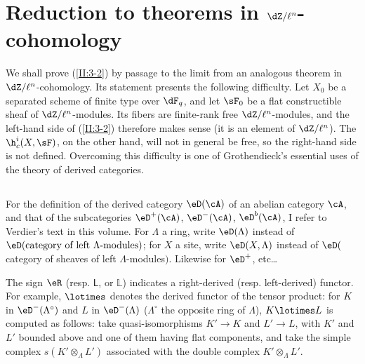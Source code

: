 \section{Reduction to theorems in \texorpdfstring{$\dZ/\ell^n$}{Z/l n}-cohomology}\label{II:4}

We shall prove (\ref{II:3-2}) by passage to the limit from an analogous
theorem in $\dZ/\ell^n$-cohomology. Its statement presents the following
difficulty. Let $X_0$ be a separated scheme of finite type over $\dF_q$, and
let $\sF_0$ be a flat constructible sheaf of $\dZ/\ell^n$-modules. Its fibers
are finite-rank free $\dZ/\ell^n$-modules, and the left-hand side of
(\ref{II:3-2}) therefore makes sense (it is an element of $\dZ/\ell^n$).
The $\h_c^i(X,\sF)$, on the other hand, will not in general be free, so the
right-hand side is not defined. Overcoming this difficulty is one of
Grothendieck's essential uses of the theory of derived categories.






\subsection{}\label{II:4-1}

For the definition of the derived category $\eD(\cA)$ of an abelian category
$\cA$, and that of the subcategories $\eD^+(\cA)$, $\eD^-(\cA)$,
$\eD^b(\cA)$, I refer to Verdier's text in this volume. For $\Lambda$ a ring,
write $\eD(\Lambda)$ instead of
$\eD(\text{category of left $\Lambda$-modules})$; for $X$ a site, write
$\eD(X,\Lambda)$ instead of
$\eD($category of sheaves of left $\Lambda$-modules$)$. Likewise for
$\eD^+$, etc\ldots

The sign $\eR$ (resp. $\mathsf{L}$, or $\mathbb{L}$) indicates a right-derived (resp.
left-derived) functor. For example, $\lotimes$ denotes the derived functor of
the tensor product: for $K$ in $\eD^-(\Lambda^\circ)$ and $L$ in
$\eD^-(\Lambda)$ ($\Lambda^\circ$ the opposite ring of $\Lambda$),
$K\lotimes L$ is computed as follows: take quasi-isomorphisms $K'\to K$ and
$L'\to L$, with $K'$ and $L'$ bounded above and one of them having flat
components, and take the simple complex $s(K'\otimes_\Lambda L')$ associated
with the double complex $K'\otimes_\Lambda L'$.






\subsection{}\label{II:4-2}

